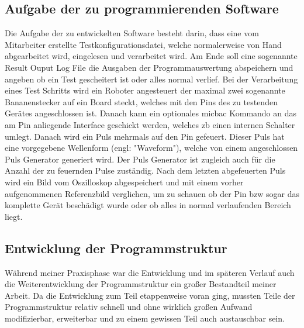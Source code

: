 \subsection{Aufgabe der zu programmierenden Software}
\label{subsec:aufgabe-software}

Die Aufgabe der zu entwickelten Software besteht darin, dass eine vom Mitarbeiter erstellte
Testkonfigurationsdatei, welche normalerweise von Hand abgearbeitet wird, eingelesen und
verarbeitet wird. Am Ende soll eine sogenannte Result Ouput Log File die Ausgaben der
Programmauswertung abspeichern und angeben ob ein Test gescheitert ist oder alles normal
verlief.
Bei der Verarbeitung eines Test Schritts wird ein Roboter angesteuert der maximal zwei
sogenannte Bananenstecker auf ein Board steckt, welches mit den Pins des zu testenden Gerätes
angeschlossen ist. Danach kann ein optionales \ac{micbac} Kommando an das am Pin anliegende
Interface geschickt werden, welches \ac{zb} einen internen Schalter umlegt. Danach wird ein
Puls mehrmals auf den Pin gefeuert. Dieser Puls hat eine vorgegebene Wellenform (engl:
"Waveform"), welche von einem angeschlossen Puls Generator generiert wird. Der Puls Generator
ist zugleich auch für die Anzahl der zu feuernden Pulse zuständig. Nach dem letzten
abgefeuerten Puls wird ein Bild vom Oszilloskop abgespeichert und mit einem vorher
aufgenommenen Referenzbild verglichen, um zu schauen ob der Pin \ac{bzw} sogar das komplette
Gerät beschädigt wurde oder ob alles in normal verlaufenden Bereich liegt. 


\subsection{Entwicklung der Programmstruktur}
\label{subsec:entw-prgstr}

Während meiner Praxisphase war die Entwicklung und im späteren Verlauf auch die
Weiterentwicklung der Programmstruktur ein großer Bestandteil meiner Arbeit. Da die Entwicklung
zum Teil etappenweise voran ging, mussten Teile der Programmstruktur relativ schnell und ohne
wirklich großen Aufwand modifizierbar, erweiterbar und zu einem gewissen Teil auch austauschbar
sein. 

